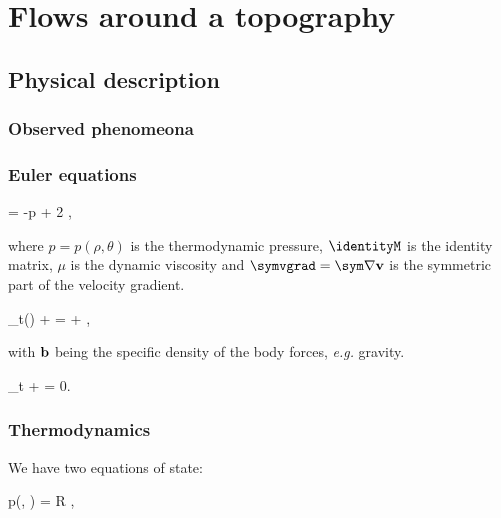 \documentclass[../main.tex]{subfiles}
\begin{document}
\chapter{Flows around a topography}
\label{chap:FLOWS}

\section{Physical description}
\label{sec:PHYSICS}

\subsection{Observed phenomeona}
\label{sec:PHENOMENA}

\subsection{Euler equations}
\label{sec:EULER_EQUATIONS}

\begin{equations}[single,*]
\cstress = -p \identityM + 2 \mu \symvgrad, 
\end{equations}

where $p = p\left(\rho, \theta\right)$ is the thermodynamic pressure, $\identityM$ is the identity matrix, $\mu$ is the dynamic viscosity and $\symvgrad = \sym \grad \vb{v}$ is the symmetric part of the velocity gradient.

\begin{equations}[single,*]
\partial_t\left(\rho {}\right) + = \divergence{\cstress} + \rho {},
\end{equations}

with $\mathbf{b}$ being the specific density of the body forces, \textit{e.g.} gravity. 

\begin{equations}[single,*]
\partial_t \rho +  = 0.
\end{equations}

\subsection{Thermodynamics}
\label{sec:THERMODYNAMICS}

We have two equations of state:

\begin{equations}[single,*]
p\left(\rho, \theta\right) = R \rho \theta,
\end{equations}
\end{document}

